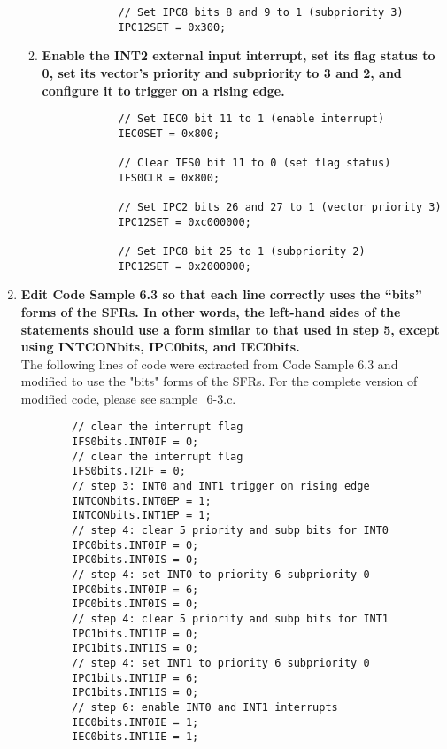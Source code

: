 \documentclass{article}
\begin{document}
\begin{enumerate}[label=\textbf{\arabic*})]
\begin{enumerate}[label=\textbf{\alph*}.]
\begin{lstlisting}
            // Set IPC8 bits 8 and 9 to 1 (subpriority 3)
            IPC12SET = 0x300; 
        \end{lstlisting}

        \item \textbf{Enable the INT2 external input interrupt, set its flag status to 0, set its vector’s
        priority and subpriority to 3 and 2, and configure it to trigger on a rising edge.} \\

        \begin{lstlisting}
            // Set IEC0 bit 11 to 1 (enable interrupt)
            IEC0SET = 0x800; 

            // Clear IFS0 bit 11 to 0 (set flag status)
            IFS0CLR = 0x800; 

            // Set IPC2 bits 26 and 27 to 1 (vector priority 3)
            IPC12SET = 0xc000000; 

            // Set IPC8 bit 25 to 1 (subpriority 2)
            IPC12SET = 0x2000000; 
        \end{lstlisting}
        
    \end{enumerate}

    \pagebreak
    \item \textbf{Edit Code Sample 6.3 so that each line correctly uses the “bits” forms of the SFRs.
    In other words, the left-hand sides of the statements should use a form similar to that
    used in step 5, except using INTCONbits, IPC0bits, and IEC0bits.} \\

    The following lines of code were extracted from Code Sample 6.3 and modified to use the "bits" forms
    of the SFRs. For the complete version of modified code, please see sample\_6-3.c.

    \begin{lstlisting}
        // clear the interrupt flag
        IFS0bits.INT0IF = 0;   
        // clear the interrupt flag 
        IFS0bits.T2IF = 0;      
        // step 3: INT0 and INT1 trigger on rising edge
        INTCONbits.INT0EP = 1; 
        INTCONbits.INT1EP = 1;                  
        // step 4: clear 5 priority and subp bits for INT0
        IPC0bits.INT0IP = 0;    
        IPC0bits.INT0IS = 0;   
        // step 4: set INT0 to priority 6 subpriority 0
        IPC0bits.INT0IP = 6;    
        IPC0bits.INT0IS = 0;    
        // step 4: clear 5 priority and subp bits for INT1
        IPC1bits.INT1IP = 0;    
        IPC1bits.INT1IS = 0;    
        // step 4: set INT1 to priority 6 subpriority 0
        IPC1bits.INT1IP = 6;    
        IPC1bits.INT1IS = 0;   
        // step 6: enable INT0 and INT1 interrupts 
        IEC0bits.INT0IE = 1;    
        IEC0bits.INT1IE = 1;
    \end{lstlisting}


\end{enumerate}
\end{document}
